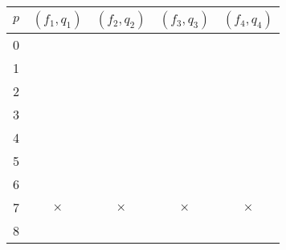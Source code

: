 \begin{table}[H]
	\centering
	\begin{tabular}{ | c | c | c | c | c | } 
		\hline
		$p$ & $(f_1, q_1)$ & $(f_2, q_2)$ & $(f_3, q_3)$ & $(f_4, q_4)$ \\ 
		\hline
		0 & & & & \\\hline
		1 & & & & \\\hline
		2 & & & &\\\hline
		3 & & & & \\\hline
		4 & & & & \\\hline
		5 & & & & \\\hline
		6 & & & & \\\hline
		7 & $\times$ & $\times$ & $\times$ & $\times$ \\\hline
		8 & & & & \\\hline
	\end{tabular}
\end{table}


